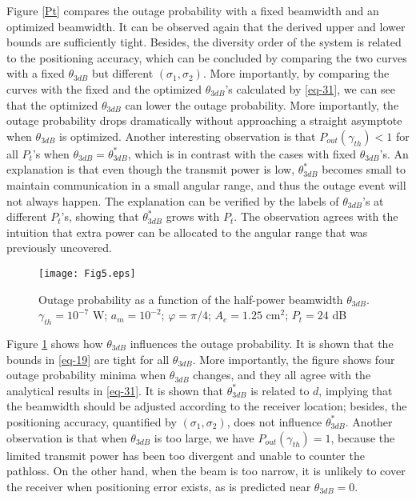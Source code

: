 \documentclass{IEEEtran}
\begin{document}
Figure \ref{Pt} compares the outage probability with a fixed beamwidth and an optimized beamwidth. It can be observed again that the derived upper and lower bounds are sufficiently tight. Besides, the diversity order of the system is related to the positioning accuracy, which can be concluded by comparing the two curves with a fixed $\theta_{3dB}$ but different $(\sigma_1, \sigma_2)$. More importantly, by comparing the curves with the fixed and the optimized $\theta_{3dB}$'s calculated by \eqref{eq-31}, we can see that the optimized $\theta_{3dB}$ can lower the outage probability. More importantly, the outage probability drops dramatically without approaching a straight asymptote when $\theta_{3dB}$ is optimized. Another interesting observation is that $P_{out}(\gamma_{th})<1$ for all $P_t$'s when $\theta_{3dB}=\theta_{3dB}^*$, which is in contrast with the cases with fixed $\theta_{3dB}$'s. An explanation is that even though the transmit power is low, $\theta_{3dB}^*$ becomes small to maintain communication in a small angular range, and thus the outage event will not always happen. The explanation can be verified by the labels of $\theta_{3dB}$'s at different $P_t$'s, showing that $\theta_{3dB}^*$ grows with $P_t$. The observation agrees with the intuition that extra power can be allocated to the angular range that was previously uncovered.

\begin{figure}
  \centering
  \texttt{[image: Fig5.eps]}\\
  \caption{Outage probability as a function of the half-power beamwidth $\theta_{3dB}$. $\gamma_{th}=10^{-7}$ W; $a_m=10^{-2}$; $\varphi=\pi/4$; {{ $A_e=1.25$ cm$^2$}}; $P_t=24$ dB}\label{theta3dB}
\end{figure}
Figure \ref{theta3dB} shows how $\theta_{3dB}$ influences the outage probability. It is shown that the bounds in \eqref{eq-19} are tight for all $\theta_{3dB}$. More importantly, the figure shows four outage probability minima when $\theta_{3dB}$ changes, and they all agree with the analytical results in \eqref{eq-31}. It is shown that $\theta_{3dB}^*$ is related to $d$, implying that the beamwidth should be adjusted according to the receiver location; besides, the positioning accuracy, quantified by $(\sigma_1, \sigma_2)$, does not influence $\theta_{3dB}^*$. Another observation is that when $\theta_{3dB}$ is too large, we have $P_{out}(\gamma_{th})=1$, because the limited transmit power has been too divergent and unable to counter the pathloss. On the other hand, when the beam is too narrow, it is unlikely to cover the receiver when positioning error exists, as is predicted near $\theta_{3dB}=0$.
\end{document}
